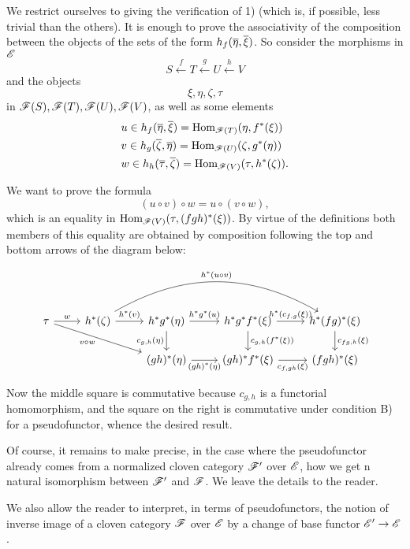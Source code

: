We restrict ourselves to giving the verification of 1) (which is, if possible, less trivial than the others). It is enough to prove the associativity of the composition between the objects of the sets of the form $h_f (\overline \eta, \overline \xi)$. So consider the morphisms in $\mathscr{E}$
\[
    S \xleftarrow{f} T \xleftarrow{g} U \xleftarrow{h} V
\]
and the objects
\[\xi, \eta, \zeta, \tau\]
in $\mathscr{F} (S), \mathscr{F} (T), \mathscr{F} (U), \mathscr{F} (V)$, as well as some elements
\begin{align*}
    &u \in h_f(\overline \eta, \overline \xi) = \mathrm{Hom}_{\mathscr{F}(T)} (\eta, f^\ast(\xi))\\
    &v \in h_g(\overline \zeta, \overline \eta) = \mathrm{Hom}_{\mathscr{F}(U)} (\zeta, g^\ast(\eta))\\
    &w \in h_h(\overline \tau, \overline \zeta) = \mathrm{Hom}_{\mathscr{F}(V)} (\tau, h^\ast(\zeta)).
\end{align*}

We want to prove the formula
\[(u \circ v) \circ w = u \circ (v \circ w),
\]
which is an equality in $\mathrm{Hom}_{\mathscr{F} (V)} (\tau, (fgh)^\ast(\xi))$. By virtue of the definitions both members of this equality are obtained by composition following the top and bottom arrows of the diagram below:

\[
\begin{tikzcd}
    \tau
    \arrow[r, "w"]
    \arrow[rrd, "v \circ w", swap]
    &
    h^\ast(\zeta) 
    \arrow[r, "h^\ast(v)"]
    \arrow[rrr, "h^\ast (u \circ v)", bend left]
    &
    h^\ast g^\ast(\eta)
    \arrow[r, "h^\ast g^\ast (u)"]
    \arrow[d, "c_{g,h}(\eta)", swap]
    &
    h^\ast g^\ast f^\ast (\xi)
    \arrow[r, "h^\ast (c_{f,g}(\xi))"]
    \arrow[d, "c_{g,h}(f^\ast (\xi))"]
    &
    h^\ast (fg)^\ast (\xi)
    \arrow[d, "c_{fg,h}(\xi)"]
    \\&&
    (gh)^\ast (\eta)
    \arrow[r, "(gh)^\ast (\eta)", swap]
    &
    (gh)^\ast f^\ast (\xi)
    \arrow[r, "c_{f,gh}(\xi)", swap]
    &
    (fgh)^\ast (\xi)
\end{tikzcd}\]

Now the middle square is commutative because $c_{g, h}$ is a functorial homomorphism, and the square on the right is commutative under condition B) for a pseudofunctor, whence the desired result.

Of course, it remains to make precise, in the case where the pseudofunctor already comes from a normalized cloven category $\mathscr{F}'$ over $\mathscr{E}$, how we get n natural isomorphism between $\mathscr{F}'$ and $\mathscr{F}$. We leave the details to the reader.

We also allow the reader to interpret, in terms of pseudofunctors, the notion of inverse image of a cloven category $\mathscr{F}$ over $\mathscr{E}$ by a change of base functor $\mathscr{E}'\to \mathscr{E}$.
